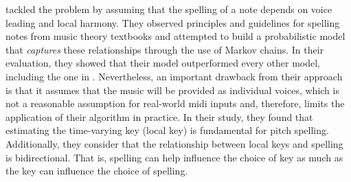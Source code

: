 \textcite{teodoru2007pitch} tackled the problem by assuming
that the spelling of a note depends on voice leading and
local harmony. They observed principles and guidelines for
spelling notes from music theory textbooks
\parencite{aldwell1978harmony,rimskykorsakov2005practical}
and attempted to build a probabilistic model that
\emph{captures} these relationships through the use of
Markov chains. In their evaluation, they showed that their
model outperformed every other model, including the one in
\textcite{meredith2006ps13}. Nevertheless, an important
drawback from their approach is that it assumes that the
music will be provided as individual voices, which is not a
reasonable assumption for real-world \gls{midi} inputs and,
therefore, limits the application of their algorithm in
practice. In their study, they found that estimating the
time-varying key (local key) is fundamental for pitch
spelling. Additionally, they consider that the relationship
between local keys and spelling is bidirectional. That is,
spelling can help influence the choice of key as much as the
key can influence the choice of spelling.
